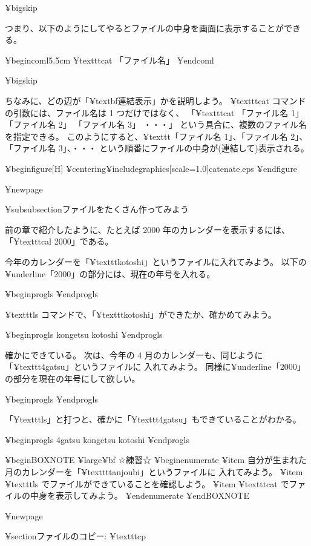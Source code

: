 ¥bigskip

つまり、以下のようにしてやるとファイルの中身を画面に表示することができる。

¥begin{coml}{5.5cm}
¥texttt{cat} 「ファイル名」
¥end{coml}

¥bigskip

ちなみに、どの辺が「¥textbf{連結}表示」かを説明しよう。
 ¥texttt{cat} コマンドの引数には、ファイル名は 1 つだけではなく、
「¥texttt{cat 「ファイル名 1」 「ファイル名 2」 「ファイル名 3」 ・・・}」
という具合に、複数のファイル名を指定できる。
このようにすると、¥texttt{「ファイル名 1」、「ファイル名 2」、
「ファイル名 3」、・・・}
という順番にファイルの中身が(連結して)表示される。

¥begin{figure}[H]
¥centering{¥includegraphics[scale=1.0]{catenate.eps}}
¥end{figure}

¥newpage

¥subsubsection{ファイルをたくさん作ってみよう}

前の章で紹介したように、たとえば 2000 年のカレンダーを表示するには、
「¥texttt{cal 2000}」である。

今年のカレンダーを「¥texttt{kotoshi}」というファイルに入れてみよう。
以下の ¥underline{「2000」}の部分には、現在の年号を入れる。

¥begin{progls}
%
¥end{progls}

 ¥texttt{ls} コマンドで、「¥texttt{kotoshi}」ができたか、確かめてみよう。

¥begin{progls}
kongetsu        kotoshi
%
¥end{progls}

確かにできている。
次は、今年の 4 月のカレンダーも、同じように「¥texttt{4gatsu}」というファイルに
入れてみよう。
同様に¥underline{「2000」}の部分を現在の年号にして欲しい。

¥begin{progls}
%
¥end{progls}

「¥texttt{ls}」と打つと、確かに「¥texttt{4gatsu}」もできていることがわかる。

¥begin{progls}
4gatsu          kongetsu        kotoshi
%
¥end{progls}

¥begin{BOXNOTE}
{¥large¥bf ☆練習☆}
¥begin{enumerate}
¥item 自分が生まれた月のカレンダーを「¥texttt{tanjoubi}」というファイルに
入れてみよう。
¥item ¥texttt{ls} でファイルができていることを確認しよう。
¥item ¥texttt{cat} でファイルの中身を表示してみよう。
¥end{enumerate}
¥end{BOXNOTE}

¥newpage

¥section{ファイルのコピー: ¥texttt{cp}}

